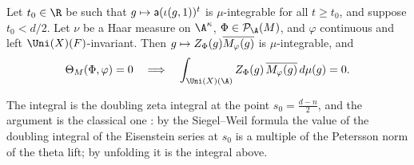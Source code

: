 \begin{theorem}\label{pf:tlift:rallisthm}
Let $t_0\in\R$ be such that $g\mapsto\mathsf{a}(\iota(g,1))^t$ is $\mu$-integrable for all $t\ge t_0$, and suppose
$t_0<d/2$. Let $\nu$ be a Haar measure on $\A^\kappa$, $\Phi\in\tliftPD(M)$, and $\varphi$ continuous and left
$\Uni(X)(F)$-invariant. Then $g\mapsto Z_\Phi(g)\overline{M_\varphi(g)}$ is $\mu$-integrable, and
\[
  \tliftlift_M(\Phi,\varphi)=0\quad\Longrightarrow\quad\int_{\Uni(X)(\A)}\tliftZ_\Phi(g)\,\overline{\tliftM_\varphi(g)}\,d\mu(g)=0.
\]
\end{theorem}

The integral is the doubling zeta integral at the point $s_0=\frac{d-n}2$, and the argument is the
classical one \cite{Rallis1984,PiatetskiShapiroRallis1987,Li1992}: by the Siegel--Weil formula the value of
the doubling integral of the Eisenstein series at $s_0$ is a multiple of the Petersson norm of the theta
lift; by unfolding it is the integral above.


